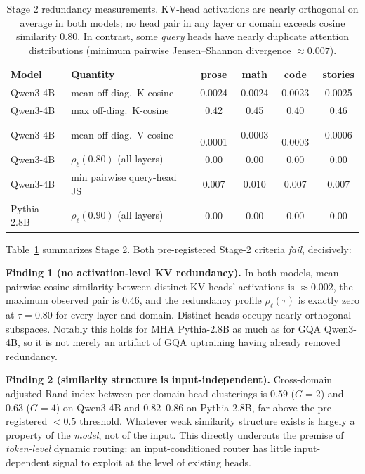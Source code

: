 \documentclass{article}
\begin{document}
\begin{table}[t]
\centering
\small
\begin{tabular}{llcccc}
\toprule
Model & Quantity & prose & math & code & stories \\
\midrule
Qwen3-4B & mean off-diag.\ K-cosine & 0.0024 & 0.0024 & 0.0023 & 0.0025 \\
Qwen3-4B & max off-diag.\ K-cosine & 0.42 & 0.45 & 0.40 & 0.46 \\
Qwen3-4B & mean off-diag.\ V-cosine & $-$0.0001 & 0.0003 & $-$0.0003 & 0.0006 \\
Qwen3-4B & $\rho_\ell(0.80)$ (all layers) & 0.00 & 0.00 & 0.00 & 0.00 \\
Qwen3-4B & min pairwise query-head JS & 0.007 & 0.010 & 0.007 & 0.007 \\
Pythia-2.8B & $\rho_\ell(0.90)$ (all layers) & 0.00 & 0.00 & 0.00 & 0.00 \\
\bottomrule
\end{tabular}
\caption{Stage 2 redundancy measurements. KV-head activations are nearly
orthogonal on average in both models; no head pair in any layer or domain
exceeds cosine similarity $0.80$. In contrast, some \emph{query} heads have
nearly duplicate attention distributions (minimum pairwise Jensen--Shannon
divergence $\approx 0.007$).}
\label{tab:stage2}
\end{table}

Table~\ref{tab:stage2} summarizes Stage 2. Both pre-registered Stage-2
criteria \emph{fail}, decisively:

\textbf{Finding 1 (no activation-level KV redundancy).} In both models, mean
pairwise cosine similarity between distinct KV heads' activations is
$\approx 0.002$, the maximum observed pair is $0.46$, and the redundancy
profile $\rho_\ell(\tau)$ is exactly zero at $\tau = 0.80$ for every layer
and domain. Distinct heads occupy nearly orthogonal subspaces. Notably this
holds for MHA Pythia-2.8B as much as for GQA Qwen3-4B, so it is not merely
an artifact of GQA uptraining having already removed redundancy.

\textbf{Finding 2 (similarity structure is input-independent).} Cross-domain
adjusted Rand index between per-domain head clusterings is $0.59$ ($G{=}2$)
and $0.63$ ($G{=}4$) on Qwen3-4B and $0.82$--$0.86$ on Pythia-2.8B, far
above the pre-registered $< 0.5$ threshold. Whatever weak similarity
structure exists is largely a property of the \emph{model}, not of the
input. This directly undercuts the premise of \emph{token-level} dynamic
routing: an input-conditioned router has little input-dependent signal to
exploit at the level of existing heads.
\end{document}
